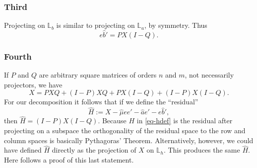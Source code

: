 \documentclass[
  12pt,
  letterpaper,
  DIV=11,
  numbers=noendperiod]{scrartcl}
\begin{document}
\subsubsection{Third}\label{third}

Projecting on \(\mathbb{L}_b\) is similar to projecting on
\(\mathbb{L}_a\), by symmetry. Thus \begin{equation}
e\hat b'=PX(I-Q).
\end{equation}

\subsubsection{Fourth}\label{fourth}

If \(P\) and \(Q\) are arbitrary square matrices of orders \(n\) and
\(m\), not necessarily projectors, we have \begin{equation}
X=PXQ+(I-P)XQ+PX(I-Q)+(I-P)X(I-Q).
\end{equation} For our decomposition it follows that if we define the
``residual'' \begin{equation}
\hat H:=X-\hat\mu ee'-\hat ae'-e\hat b'\label{eq-hdef},
\end{equation} then \(\hat H=(I-P)X(I-Q)\). Because \(H\) in
\eqref{eq-hdef} is the residual after projecting on a subspace the
orthogonality of the residual space to the row and column spaces is
basically Pythagoras' Theorem. Alternatively, however, we could have
defined \(\hat H\) directly as the projection of \(X\) on
\(\mathbb{L}_h\). This produces the same \(\hat H\). Here follows a
proof of this last statement.
\end{document}
